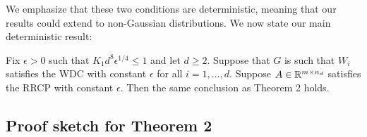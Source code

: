 \documentclass{article}
\begin{document}
We emphasize that these two conditions are deterministic, meaning that our results could extend to non-Gaussian distributions. We now state our main deterministic result:

\begin{thm} Fix $\epsilon > 0$ such that $K_1d^8 \epsilon^{1/4} \leq 1$ and let $d \geq 2$. Suppose that $G$ is such that $W_i$ satisfies the WDC with constant $\epsilon$ for all $i = 1,\dots,d$. Suppose $A \in \mathbb{R}^{m \times n_d}$ satisfies the RRCP with constant $\epsilon$. Then the same conclusion as Theorem 2 holds.
\end{thm} 


\subsection{Proof sketch for Theorem 2}
\end{document}
